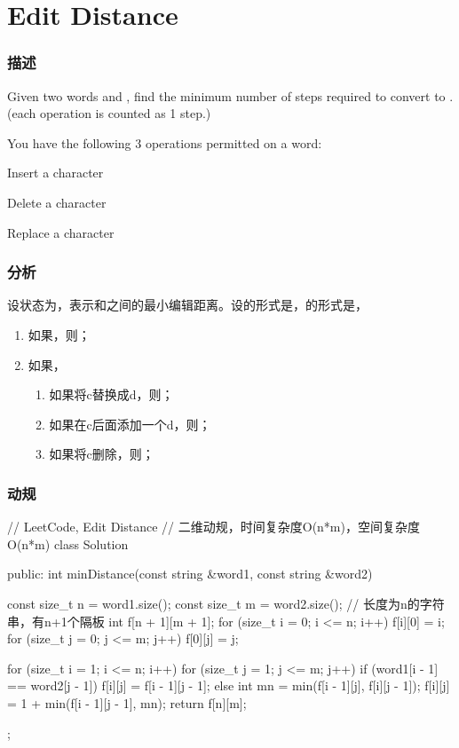 \section{Edit Distance} %
\label{sec:edit-distance}


\subsubsection{描述}
Given two words  and , find the minimum number of steps required to convert  to . (each operation is counted as 1 step.)

You have the following 3 operations permitted on a word:
\begindot
\item Insert a character
\item Delete a character
\item Replace a character
\myenddot


\subsubsection{分析}
设状态为，表示和之间的最小编辑距离。设的形式是，的形式是，
\begin{enumerate}
\item 如果，则；
\item 如果，
    \begin{enumerate}
        \item 如果将c替换成d，则；
        \item 如果在c后面添加一个d，则；
        \item 如果将c删除，则；
    \end{enumerate}
\end{enumerate}


\subsubsection{动规}
\begin{Code}
// LeetCode, Edit Distance
// 二维动规，时间复杂度O(n*m)，空间复杂度O(n*m)
class Solution {
public:
    int minDistance(const string &word1, const string &word2) {
        const size_t n = word1.size();
        const size_t m = word2.size();
        // 长度为n的字符串，有n+1个隔板
        int f[n + 1][m + 1];
        for (size_t i = 0; i <= n; i++)
            f[i][0] = i;
        for (size_t j = 0; j <= m; j++)
            f[0][j] = j;

        for (size_t i = 1; i <= n; i++) {
            for (size_t j = 1; j <= m; j++) {
                if (word1[i - 1] == word2[j - 1])
                    f[i][j] = f[i - 1][j - 1];
                else {
                    int mn = min(f[i - 1][j], f[i][j - 1]);
                    f[i][j] = 1 + min(f[i - 1][j - 1], mn);
                }
            }
        }
        return f[n][m];
    }
};
\end{Code}


